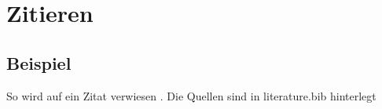 \chapter{Zitieren}

\section{Beispiel}

So wird auf ein Zitat verwiesen \cite{B01_MlPython3}. Die Quellen sind in literature.bib hinterlegt